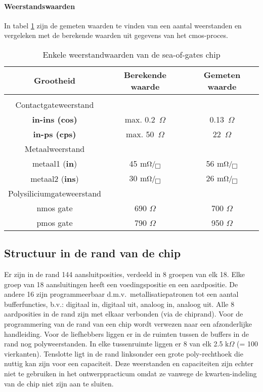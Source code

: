 \paragraph{Weerstandswaarden} In tabel \ref{weerstandwaarden} zijn de gemeten waarden te vinden van een aantal weerstanden en vergeleken met de berekende waarden uit gegevens van het cmos-proces.

\begin{table}[hbt]
\begin{center}
\begin{tabular}{ccc}
\hline
Grootheid & Berekende waarde & Gemeten waarde\\
\hline\\
Contactgateweerstand\\
{\bf in-ins (cos)} & max. 0.2~$\Omega$ & 0.13~$\Omega$\\
{\bf in-ps (cps)} & max. 50~$\Omega$ & 22~$\Omega$\\
Metaalweerstand\\
metaal1 ({\bf in}) & 45 m$\Omega/\fbox{}$ & 56 m$\Omega/\fbox{}$\\
metaal2 ({\bf ins})& 30 m$\Omega/\fbox{}$ & 26 m$\Omega/\fbox{}$\\
Polysiliciumgateweerstand\\
nmos gate & 690 $\Omega$ & 700 $\Omega$\\
pmos gate & 790 $\Omega$ & 950 $\Omega$\\
\hline
\end{tabular}
\caption{\label{weerstandwaarden} Enkele weerstandwaarden van de sea-of-gates chip} 
\end{center}
\end{table}

\subsection{Structuur in de rand van de chip}

Er zijn in de rand 144 aansluitposities, verdeeld in 8 groepen van elk 18.
Elke groep van 18 aansluitingen heeft een voedingspositie en een aardpositie.
De andere 16 zijn 
programmeerbaar d.m.v.\ metallisatiepatronen tot een aantal
bufferfuncties, b.v.: digitaal in, digitaal uit, analoog in, analoog uit.
Alle 8 aardposities in de rand zijn met elkaar verbonden (via de 
chiprand).
Voor de programmering van de rand van een chip wordt verwezen
naar een afzonderlijke handleiding. Voor de liefhebbers liggen
er in de ruimten tussen de buffers in de rand nog polyweerstanden.
In elke tussenruimte liggen er 8 van elk 2.5 k$\Omega$ (= 100 vierkanten).
Tenslotte ligt
in de rand linksonder een grote poly-rechthoek die nuttig kan zijn
voor een capaciteit. Deze weerstanden en capaciteiten zijn echter niet 
te gebruiken in het ontwerppracticum omdat ze vanwege de kwarten-indeling
van de chip niet zijn aan te sluiten.\\
\\
\\

